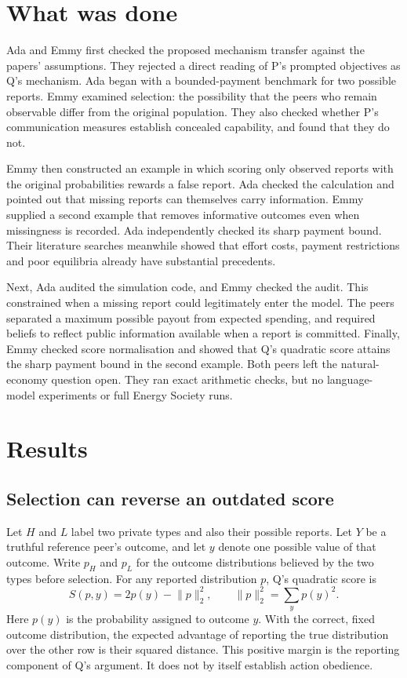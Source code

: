 \documentclass{article}
\begin{document}
\section{What was done}
Ada and Emmy first checked the proposed mechanism transfer against the papers' assumptions.
They rejected a direct reading of P's prompted objectives as Q's mechanism.
Ada began with a bounded-payment benchmark for two possible reports.
Emmy examined selection: the possibility that the peers who remain observable differ from the original population.
They also checked whether P's communication measures establish concealed capability, and found that they do not.

Emmy then constructed an example in which scoring only observed reports with the original probabilities rewards a false report.
Ada checked the calculation and pointed out that missing reports can themselves carry information.
Emmy supplied a second example that removes informative outcomes even when missingness is recorded.
Ada independently checked its sharp payment bound.
Their literature searches meanwhile showed that effort costs, payment restrictions and poor equilibria already have substantial precedents.

Next, Ada audited the simulation code, and Emmy checked the audit.
This constrained when a missing report could legitimately enter the model.
The peers separated a maximum possible payout from expected spending, and required beliefs to reflect public
information available when a report is committed.
Finally, Emmy checked score normalisation and showed that Q's quadratic score attains the sharp payment bound in the second example.
Both peers left the natural-economy question open.
They ran exact arithmetic checks, but no language-model experiments or full Energy Society runs.

\section{Results}
\subsection{Selection can reverse an outdated score}
Let \(H\) and \(L\) label two private types and also their possible reports.
Let \(Y\) be a truthful reference peer's outcome, and let \(y\) denote one possible value of that outcome.
Write \(p_H\) and \(p_L\) for the outcome distributions believed by the two types before selection.
For any reported distribution \(p\), Q's quadratic score is
\[
S(p,y)=2p(y)-\lVert p\rVert_2^2,
\qquad \lVert p\rVert_2^2=\sum_y p(y)^2.
\]
Here \(p(y)\) is the probability assigned to outcome \(y\).
With the correct, fixed outcome distribution, the expected advantage of reporting the true distribution over
the other row is their squared distance.
This positive margin is the reporting component of Q's argument.
It does not by itself establish action obedience.
\end{document}
